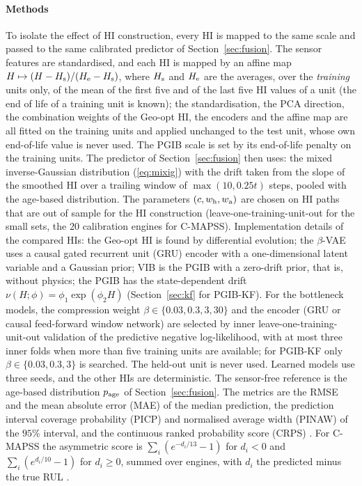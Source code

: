 \documentclass[preprint,12pt]{elsarticle}
\theoremstyle{definition}
\begin{document}
\paragraph{Methods} To isolate the effect of HI construction, every HI is mapped to the same scale and passed to the same calibrated predictor of Section~\ref{sec:fusion}. The sensor features are standardised, and each HI is mapped by an affine map $H\mapsto(H-H_{\rm s})/(H_{\rm e}-H_{\rm s})$, where $H_{\rm s}$ and $H_{\rm e}$ are the averages, over the \emph{training} units only, of the mean of the first five and of the last five HI values of a unit (the end of life of a training unit is known); the standardisation, the PCA direction, the combination weights of the Geo-opt HI, the encoders and the affine map are all fitted on the training units and applied unchanged to the test unit, whose own end-of-life value is never used. The PGIB scale is set by its end-of-life penalty on the training units. The predictor of Section~\ref{sec:fusion} then uses: the mixed inverse-Gaussian distribution (\ref{eq:mixig}) with the drift taken from the slope of the smoothed HI over a trailing window of $\max(10,0.25t)$ steps, pooled with the age-based distribution. The parameters $(c,w_{\rm h},w_{\rm a})$ are chosen on HI paths that are out of sample for the HI construction (leave-one-training-unit-out for the small sets, the $20$ calibration engines for C-MAPSS). Implementation details of the compared HIs: the Geo-opt HI is found by differential evolution; the $\beta$-VAE uses a causal gated recurrent unit (GRU) encoder with a one-dimensional latent variable and a Gaussian prior; VIB is the PGIB with a zero-drift prior, that is, without physics; the PGIB has the state-dependent drift $\nu(H;\phi)=\phi_1\exp(\phi_2H)$ (Section~\ref{sec:kf} for PGIB-KF). For the bottleneck models, the compression weight $\beta\in\{0.03,0.3,3,30\}$ and the encoder (GRU or causal feed-forward window network) are selected by inner leave-one-training-unit-out validation of the predictive negative log-likelihood, with at most three inner folds when more than five training units are available; for PGIB-KF only $\beta\in\{0.03,0.3,3\}$ is searched. The held-out unit is never used. Learned models use three seeds, and the other HIs are deterministic. The sensor-free reference is the age-based distribution $p_{\rm age}$ of Section~\ref{sec:fusion}. The metrics are the RMSE and the mean absolute error (MAE) of the median prediction, the prediction interval coverage probability (PICP) and normalised average width (PINAW) of the $95\%$ interval, and the continuous ranked probability score (CRPS) \cite{gneiting2007}. For C-MAPSS the asymmetric score is $\sum_i(e^{-d_i/13}-1)$ for $d_i<0$ and $\sum_i(e^{d_i/10}-1)$ for $d_i\ge0$, summed over engines, with $d_i$ the predicted minus the true RUL \cite{saxena2008}.
\end{document}
